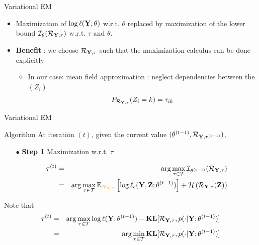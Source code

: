 \documentclass[compress,10pt]{beamer}
\begin{document}
 \begin{frame}{Variational EM }
 

\begin{itemize}
\item Maximization of  $\log \ell(\mathbf{Y} ; \theta)$  w.r.t.  $\theta$ replaced by maximization of the lower bound $\mathcal{I}_{\theta}(\mathcal{R}_{\mathbf{Y},\mathbf{\tau}}) $  w.r.t.  $\tau$ and $\theta$. 
\item \textbf{Benefit} : we choose   $\mathcal{R}_{\mathbf{Y},\mathbf{\tau}}$  such that the maximization calculus can be done explicitly
 \begin{itemize}
 \item In our case: mean field approximation : neglect dependencies between the  $(Z_i)$ 
 $$P_{\mathcal{R}_{\mathbf{Y},\mathbf{\tau}}}(Z_i=k) = \tau_{ik}$$
  \end{itemize}



 \end{itemize}
  \end{frame}
\begin{frame}{Variational  EM}

\begin{block}{Algorithm}
 \noindent At iteration $(t)$, given the current value  $(\theta^{(t-1)},\mathcal{R}_{\mathbf{Y}, \mathbf{\tau}^{(t-1)}})$,
\begin{enumerate}
\item[$\bullet$]\textbf{Step 1} Maximization w.r.t. $\tau$

\begin{eqnarray*}
\btau^{(t)}  &=&  \arg \max_{\btau  \in \mathcal{T}}  \mathcal{I}_{\theta^{(t-1)}}(\mathcal{R}_{\Xall,\btau})\\
 &=&  \arg \max_{\btau  \in \mathcal{T}}   \mathbb{E}_{\color{dgreen}\mathcal{R}_{\Xall,\btau}} \left[\log \ell_c(\bX,\bZ;  \theta^{(t-1)})   \right] +  \mathcal{H}\left(\mathcal{R}_{\Xall,\btau}(\bZ)\right) 
 \end{eqnarray*}
 \end{enumerate}
 \end{block} 
 
Note that 
\begin{eqnarray*}
\mathbf{\tau}^{(t)}  &=&  \arg \max_{\mathbf{\tau}  \in \mathcal{T}}  \log \ell(\mathbf{Y} ; \theta^{(t-1)})  -  \mathbf{KL}[\mathcal{R}_{\mathbf{Y}, \mathbf{\tau}}, p(\cdot | \mathbf{Y}; \theta^{(t-1)})]\\ 
&=& \arg \min_{\mathbf{\tau}  \in \mathcal{T}}\mathbf{KL}[\mathcal{R}_{\mathbf{Y}, \mathbf{\tau}}, p(\cdot | \mathbf{Y}; \theta^{(t-1)})] 
 \end{eqnarray*}
 \end{frame}
\end{document}
